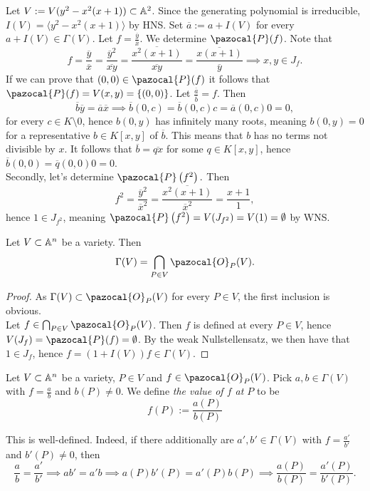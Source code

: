\begin{example}
    Let $V:=V(y^2-x^2(x+1))\subset \mathbb{A}^2$. Since the generating polynomial is irreducible, $I(V)=\langle y^2-x^2(x+1)\rangle$ by HNS. Set $\overline{a}:=a+I(V)$ for every $a+I(V)\in \Gamma(V)$. Let $f = \frac{\overline{y}}{\overline{x}}$. We determine $\pazocal{P}(f)$. Note that 
    $$f = \frac{\overline{y}}{\overline{x}} = \frac{\overline{y}^2}{\overline{xy}} = \frac{\overline{x^2(x+1)}}{\overline{xy}}=\frac{\overline{x(x+1)}}{\overline{y}} \implies x,y\in J_f.$$
    If we can prove that $(0,0)\in \pazocal{P}(f)$ it follows that $\pazocal{P}(f) = V(x,y)=\{(0,0)\}$. Let $\frac{\overline{a}}{\overline{
b}}=f$. Then
$$\overline{b}\overline{y} = \overline{a}\overline{x}\implies \overline{b}(0,c)=\overline{b}(0,c)c = \overline{a}(0,c)0=0,$$
for every $c\in K\setminus 0$, hence $b(0,y)$ has infinitely many roots, meaning $b(0,y)=0$ for a representative $b\in K[x,y]$ of $\overline{b}$. This means that $b$ has no terms not divisible by $x$. It follows that $\overline{b} = \overline{qx}$ for some $q\in K[x,y]$, hence $\overline{b}(0,0)=\overline{q}(0,0)0=0$.\\
Secondly, let's determine $\pazocal{P}\left(f^2\right).$ Then 
$$f^2 = \frac{\overline{
y}^2}{\overline{x}^2} = \frac{\overline{x^2(x+1)}}{\overline{x}^2}=\frac{x+1}{1},$$
hence $1\in J_{f^2}$, meaning $\pazocal{P}\left(f^2\right)=V(J_{f^2})=V(1)=\emptyset$ by WNS.
\end{example}
\begin{proposition}\label{IntersectionOfLocalRings}
    Let $V\subset \mathbb{A}^n$ be a variety. Then
    $$\Gamma(V) = \bigcap_{P\in V} \pazocal{O}_P(V).$$
\end{proposition}
\begin{proof}
    As $\Gamma(V)\subset \pazocal{O}_P(V)$ for every $P\in V$, the first inclusion is obvious.\\
    Let $f\in \bigcap_{P\in V} \pazocal{O}_P(V)$. Then $f$ is defined at every $P\in V$, hence $V(J_f)=\pazocal{P}(f)=\emptyset$. By the weak Nullstellensatz, we then have that $1\in J_f$, hence $f=(1+I(V))f\in \Gamma(V)$. 
\end{proof}
\begin{definition}
    Let $V\subset \mathbb{A}^n$ be a variety, $P\in V$ and $f\in \pazocal{O}_P(V)$. Pick $a,b\in \Gamma(V)$ with $f=\frac{a}{b}$ and $b(P)\neq0$. We define \textit{the value of $f$ at $P$} to be 
    $$f(P):= \frac{a(P)}{b(P)}$$
\end{definition}
\begin{remark}
    This is well-defined. Indeed, if there additionally are $a',b'\in \Gamma(V)$ with $f=\frac{a'}{b'}$ and $b'(P)\neq0$, then 
    $$\frac{a}{b} = \frac{a'}{b'} \implies ab' = a'b \implies a(P)b'(P)=a'(P)b(P)\implies \frac{a(P)}{b(P)}=\frac{a'(P)}{b'(P)}.$$
\end{remark}
